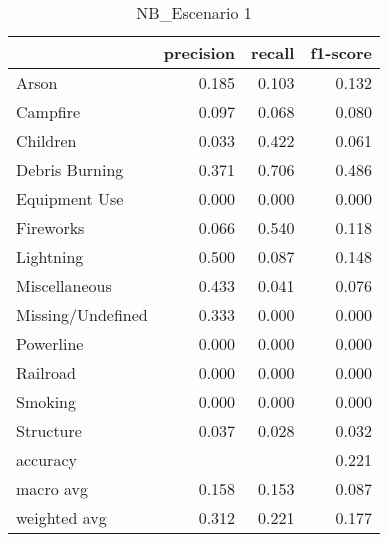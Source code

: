 \begin{table}
\centering
\caption{NB_Escenario 1}
\label{tab:Reporte de clasificación para el Escenario 1 utilizando Naïve Bayes}
\begin{tabular}{lrrr}
\toprule
{} &  precision &  recall &  f1-score \\
\midrule
Arson             &      0.185 &   0.103 &     0.132 \\
Campfire          &      0.097 &   0.068 &     0.080 \\
Children          &      0.033 &   0.422 &     0.061 \\
Debris Burning    &      0.371 &   0.706 &     0.486 \\
Equipment Use     &      0.000 &   0.000 &     0.000 \\
Fireworks         &      0.066 &   0.540 &     0.118 \\
Lightning         &      0.500 &   0.087 &     0.148 \\
Miscellaneous     &      0.433 &   0.041 &     0.076 \\
Missing/Undefined &      0.333 &   0.000 &     0.000 \\
Powerline         &      0.000 &   0.000 &     0.000 \\
Railroad          &      0.000 &   0.000 &     0.000 \\
Smoking           &      0.000 &   0.000 &     0.000 \\
Structure         &      0.037 &   0.028 &     0.032 \\
accuracy          &            &         &     0.221 \\
macro avg         &      0.158 &   0.153 &     0.087 \\
weighted avg      &      0.312 &   0.221 &     0.177 \\
\bottomrule
\end{tabular}
\end{table}
